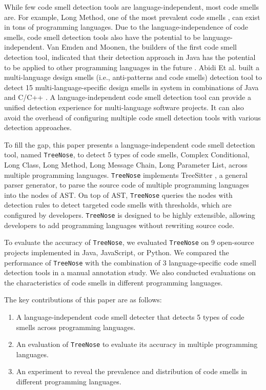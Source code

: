 While few code smell detection tools are language-independent, most code smells are. For example, Long Method, one of the most prevalent code smells \cite{developersCare}, can exist in tons of programming languages.
Due to the language-independence of code smells, code smell detection tools also have the potential to be language-independent.
Van Emden and Moonen, the builders of the first code smell detection tool, indicated that their detection
approach in Java has the potential to be applied to other programming languages in the future \cite{1173068}.
Abidi Et al. built a multi-language design smells (i.e., anti-patterns and code smells) detection tool to detect 15 multi-language-specific
design smells in system in combinations of Java and C/C++ \cite{MultiLanguageCodeSmells,Fault-Prone}. A language-independent code smell detection tool can
provide a unified detection experience for multi-language software projects. It can also avoid the overhead 
of configuring multiple code smell detection tools with various detection approaches.

To fill the gap, this paper presents a language-independent code smell detection tool, named \texttt{TreeNose}, to detect 5 types of code smells, Complex Conditional, 
Long Class, Long Method, Long Message Chain, Long Parameter List, across multiple programming languages.
\texttt{TreeNose} implements TreeSitter \cite{treeSitter}, a general parser generator,
to parse the source code of multiple programming languages into the nodes of AST. On top of AST, \texttt{TreeNose} queries the nodes with detection rules to detect targeted code smells with thresholds, which are configured by developers.
\texttt{TreeNose} is designed to be highly extensible, allowing developers to add programming languages without rewriting source code.
  
To evaluate the accuracy of \texttt{TreeNose}, we evaluated \texttt{TreeNose} on 9 open-source projects
implemented in Java, JavaScript, or Python. We compared the performance of \texttt{TreeNose} with the combination of 3 language-specific code smell detection tools 
in a manual annotation study.
We also conducted evaluations on the characteristics 
of code smells in different programming languages. 

The key contributions of this paper are as follows:

\begin{enumerate}
    \item A language-independent code smell detecter that detects 5 types of code smells across programming languages.
    \item An evaluation of \texttt{TreeNose} to evaluate its accuracy in multiple programming languages.
    \item An experiment to reveal the prevalence and distribution of code smells in different programming languages.
\end{enumerate}

